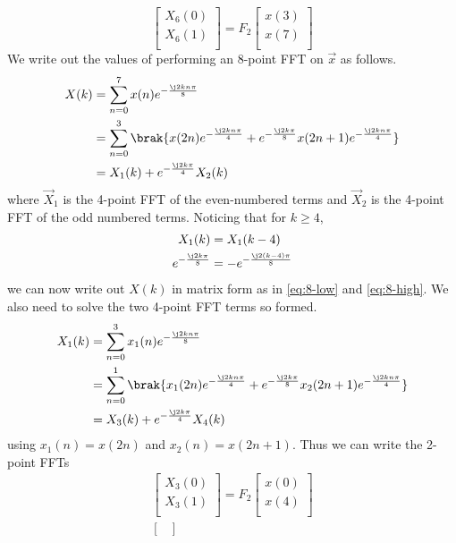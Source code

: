 \documentclass[journal,12pt,twocolumn]{IEEEtran}
\renewcommand\thesection{\arabic{section}}
\begin{document}
\begin{enumerate}[label=\thesection.\arabic*]
\begin{equation}
\begin{bmatrix}
X_{6}(0) \\ 
X_{6}(1)\\ 
\end{bmatrix}
= F_{2}
\begin{bmatrix}
x(3) \\ 
x(7) \\ 
\end{bmatrix}
\end{equation}
\solution We write out the values of performing an 8-point FFT on $\vec{x}$ as follows.
\begin{align}
	X(k) &= \sum_{n = 0}^{7}x(n)e^{-\frac{\j2kn\pi}{8}} \\
		 &= \sum_{n = 0}^{3}\brak{x(2n)e^{-\frac{\j2kn\pi}{4}} + e^{-\frac{\j2k\pi}{8}}x(2n + 1)e^{-\frac{\j2kn\pi}{4}}} \\
		 &= X_1(k) + e^{-\frac{\j2k\pi}{4}}X_2(k) 
\end{align}
where $\vec{X}_1$ is the 4-point FFT of the even-numbered terms and $\vec{X}_2$ is the 4-point FFT of the odd numbered terms. Noticing that for $k \geq 4$,
\begin{align}
	X_1(k) &= X_1(k - 4) \\
	e^{-\frac{\j2k\pi}{8}} &= -e^{-\frac{\j2(k - 4)\pi}{8}}
\end{align}
we can now write out $X(k)$ in matrix form as in \eqref{eq:8-low} and \eqref{eq:8-high}. We also need to solve the two 4-point FFT terms so formed.
\begin{align}
	X_1(k) &= \sum_{n = 0}^{3}x_1(n)e^{-\frac{\j2kn\pi}{8}} \\
		 &= \sum_{n = 0}^{1}\brak{x_1(2n)e^{-\frac{\j2kn\pi}{4}} + e^{-\frac{\j2k\pi}{8}}x_2(2n + 1)e^{-\frac{\j2kn\pi}{4}}} \\
		 &= X_3(k) + e^{-\frac{\j2k\pi}{4}}X_4(k) 
\end{align}
using $x_1(n) = x(2n)$ and $x_2(n) = x(2n + 1)$. Thus we can write the 2-point FFTs
\begin{align}
\begin{bmatrix}
X_{3}(0) \\ 
X_{3}(1)\\ 
\end{bmatrix}
= F_{2}
\begin{bmatrix}
x(0) \\ 
x(4) \\ 
\end{bmatrix} \\
\begin{bmatrix}

\end{bmatrix}
\end{align}
\end{enumerate}
\end{document}
